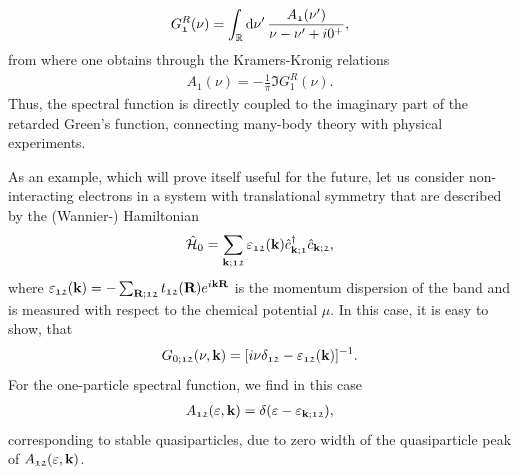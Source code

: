 \documentclass[../../main.tex]{subfiles}
\begin{document}
\begin{align}
	G_{\mathfrak{1}}^{R}(\nu)=\int_{\mathbb{R}}^{}\text{d}\nu'\,\frac{A_{\mathfrak{1}}(\nu')}{\nu-\nu'+i 0^{+}},
\end{align}
from where one obtains through the Kramers-Kronig relations
\begin{align}
	A_{\mathfrak{1}}(\nu) = -\frac1\pi \Im G_{\mathfrak{1}}^{R}(\nu).
\end{align}
Thus, the spectral function is directly coupled to the imaginary part of the retarded Green's function, connecting many-body theory with physical experiments.

As an example, which will prove itself useful for the future, let us consider non-interacting electrons in a system with translational symmetry that are described by the (Wannier-) Hamiltonian
\begin{align}
	\hat{\mathcal{H}}_0=\sum_{\textbf{k};\mathfrak{12}}\varepsilon_{\mathfrak{12}}(\textbf{k})\hat c^{\dagger}_{\textbf{k};\mathfrak{1}}\hat c_{\textbf{k};\mathfrak{2}},
\end{align}
where $\varepsilon_{\mathfrak{12}}(\textbf{k})=-\sum_{\textbf{R};\mathfrak{12}} t_{\mathfrak{12}}(\textbf{R})e^{i\textbf{kR}}$ is the momentum dispersion of the band and is measured with respect to the chemical potential $\mu$. In this case, it is easy to show, that 
\begin{align}\label{eq:non_interacting_one_p_green}
	G_{0;\mathfrak{12}}(\nu, \textbf{k})=[i\nu\delta_{\mathfrak{12}}-\varepsilon_{\mathfrak{12}}(\textbf{k})]^{-1}.
\end{align}
For the one-particle spectral function, we find in this case 
\begin{align}
	A_{\mathfrak{12}}(\varepsilon,\textbf{k})=\delta(\varepsilon-\varepsilon_{\textbf{k};\mathfrak{12}}),
\end{align}
corresponding to stable quasiparticles, due to zero width of the quasiparticle peak of $A_{\mathfrak{12}}(\varepsilon,\textbf{k})$.
\end{document}
